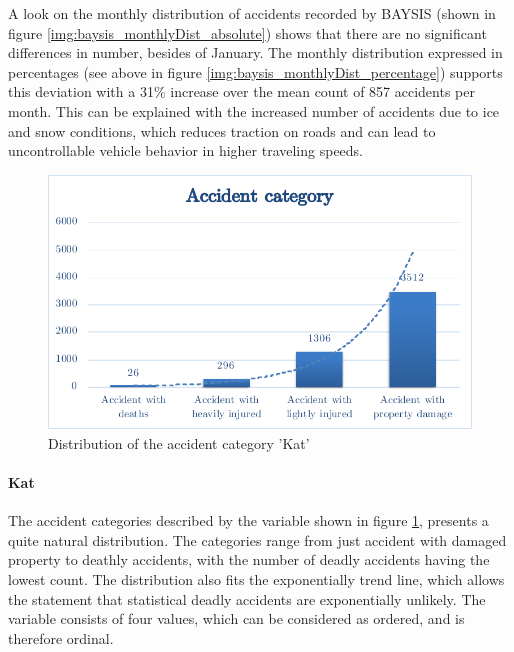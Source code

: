 \documentclass[a4paper,12pt]{report}
\begin{document}
A look on the monthly distribution of accidents recorded by BAYSIS (shown in figure \ref{img:baysis_monthlyDist_absolute}) shows that there are no significant differences in number, besides of January. The monthly distribution expressed in percentages (see above in figure \ref{img:baysis_monthlyDist_percentage}) supports this deviation with a 31\% increase over the mean count of 857 accidents per month. This can be explained with the increased number of accidents due to ice and snow conditions, which reduces traction on roads and can lead to uncontrollable vehicle behavior in higher traveling speeds.

\begin{figure}[h]
	\centering
	\includegraphics[scale=0.6]{./assets/baysis_dataset_Kat.pdf}
	\caption{Distribution of the accident category 'Kat'}
	\label{img:baysis_dataset_Kat}
\end{figure}

\paragraph{Kat}
The accident categories described by the variable shown in figure \ref{img:baysis_dataset_Kat}, presents a quite natural distribution. The categories range from just accident with damaged property to deathly accidents, with the number of deadly accidents having the lowest count. The distribution also fits the exponentially trend line, which allows the statement that statistical deadly accidents are exponentially unlikely. The variable consists of four values, which can be considered as ordered, and is therefore ordinal.
\end{document}
